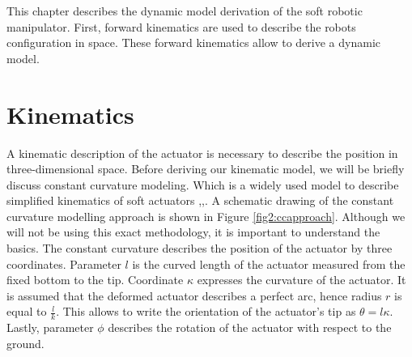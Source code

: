 \label{chap2}

This chapter describes the dynamic model derivation of the soft robotic manipulator. First, forward kinematics are used to describe the robots configuration in space. These forward kinematics allow to derive a dynamic model. 



\section{Kinematics}

A kinematic description of the actuator is necessary to describe the position in three-dimensional space. Before deriving our kinematic model, we will be briefly discuss constant curvature modeling. Which is a widely used model to describe simplified kinematics of soft actuators \cite{ccapproach},\cite{berkers},\cite{Falkenhahn2015}. A schematic drawing of the constant curvature modelling approach is shown in Figure \ref{fig2:ccapproach}. Although we will not be using this exact methodology, it is important to understand the basics. The constant curvature describes the position of the actuator by three coordinates. Parameter $l$ is the curved length of the actuator measured from the fixed bottom to the tip. Coordinate $\kappa$ expresses the curvature of the actuator. It is assumed that the deformed actuator describes a perfect arc, hence radius $r$ is equal to $\frac{l}{k}$. This allows to write the orientation of the actuator's tip as $\theta = l\kappa$. Lastly, parameter $\phi$ describes the rotation of the actuator with respect to the ground. 


